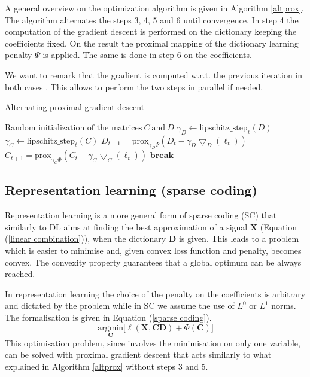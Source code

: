 \documentclass[a4paper,UKenglish]{oasics}
\begin{document}
A general overview on the optimization algorithm is given in Algorithm  \ref{altprox}. The algorithm alternates the steps 3, 4, 5 and 6 until convergence. In step 4 the computation of the gradient descent is performed on the dictionary keeping the coefficients fixed. On the result the proximal mapping of the dictionary learning penalty $\Psi$ is applied. The same is done in step 6 on the coefficients.

We want to remark that the gradient is computed w.r.t. the previous iteration in both cases \cite{rakotomamonjy2013direct}. This allows to perform the two steps in parallel if needed.

\begin{algorithm}[H]
\caption{Alternating proximal gradient descent}\label{altprox}
\begin{algorithmic}[1]
\State $\text{Random initialization of the matrices}\ C\ \text{and}\ D$
\State $\gamma_D \gets \text{lipschitz\_step}_\ell(D)$
\State $\gamma_C \gets \text{lipschitz\_step}_\ell(C)$
\State $D_{t+1} = \text{prox}_{\gamma_D \Psi}(D_t - \gamma_D \bigtriangledown_D(\ell_t))$
\State $C_{t+1} = \text{prox}_{\gamma_C \Phi}(C_t - \gamma_C \bigtriangledown_C(\ell_t))$
\State $\textbf{break}$
\EndIf
\EndFor
\end{algorithmic}

\end{algorithm}
%
%
\subsection{Representation learning (sparse coding)}
Representation learning is a more general form of sparse coding (SC) that similarly to DL aims at finding the best approximation of a signal $\textbf{X}$ (Equation (\ref{linear combination})), when the dictionary $\textbf{D}$ is given. This leads to a problem which is easier to minimise and, given convex loss function and penalty, becomes convex.
The convexity property guarantees that a global optimum can be always reached.

In representation learning the choice of the penalty on the coefficients is arbitrary and dictated by the problem while in SC we assume the use of $L^0$ or $L^1$ norms. The formalisation is given in Equation (\ref{sparse coding}).
\begin{equation}\label{sparse coding}
\underset{\textbf{C}}{\text{argmin}} \bigg[ \ell(\textbf{X}, \textbf{CD}) + \Phi(\textbf{C}) \bigg]
\end{equation}
This optimisation problem, since involves the minimisation on only one variable, can be solved with proximal gradient descent that acts similarly to what explained in Algorithm \ref{altprox} without steps 3 and 5.
%
%
\end{document}
